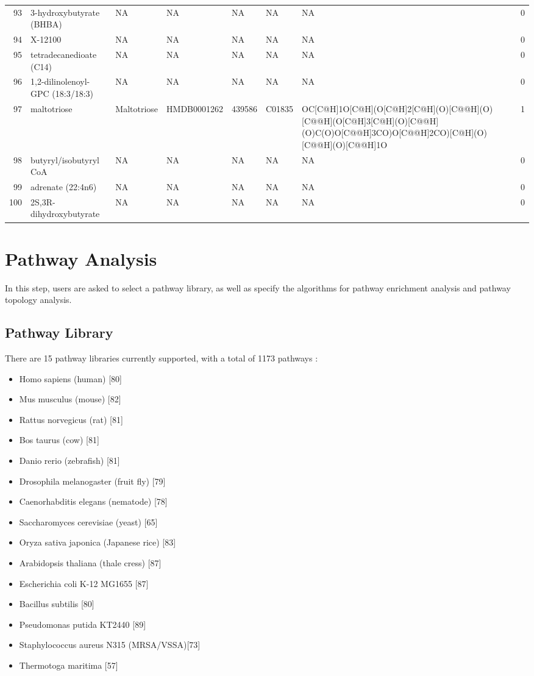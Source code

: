\documentclass[a4paper]{article}
\begin{document}
\begin{longtable}{rlllllll}
  93 & 3-hydroxybutyrate (BHBA) & NA & NA & NA & NA & NA & 0 \\ 
  94 & X-12100 & NA & NA & NA & NA & NA & 0 \\ 
  95 & tetradecanedioate (C14) & NA & NA & NA & NA & NA & 0 \\ 
  96 & 1,2-dilinolenoyl-GPC (18:3/18:3) & NA & NA & NA & NA & NA & 0 \\ 
  97 & maltotriose & Maltotriose & HMDB0001262 & 439586 & C01835 & OC[C@H]1O[C@H](O[C@H]2[C@H](O)[C@@H](O)[C@@H](O[C@H]3[C@H](O)[C@@H](O)C(O)O[C@@H]3CO)O[C@@H]2CO)[C@H](O)[C@@H](O)[C@@H]1O & 1 \\ 
  98 & butyryl/isobutyryl CoA & NA & NA & NA & NA & NA & 0 \\ 
  99 & adrenate (22:4n6) & NA & NA & NA & NA & NA & 0 \\ 
  100 & 2S,3R-dihydroxybutyrate & NA & NA & NA & NA & NA & 0 \\ 
   \hline
\hline
\end{longtable}
\endgroup\clearpage


\section{Pathway Analysis}

In this step, users are asked to select a pathway library, as well as specify the algorithms for pathway
enrichment analysis and pathway topology analysis. 

\subsection{Pathway Library}

There are 15 pathway libraries currently supported, with a total of 1173 pathways :

\begin{itemize}
\item{Homo sapiens (human) [80]}
\item{Mus musculus (mouse) [82]}
\item{Rattus norvegicus (rat) [81]}
\item{Bos taurus (cow) [81]}
\item{Danio rerio (zebrafish) [81]}
\item{Drosophila melanogaster (fruit fly) [79]}
\item{Caenorhabditis elegans (nematode) [78]}
\item{Saccharomyces cerevisiae (yeast) [65]}
\item{Oryza sativa japonica (Japanese rice) [83]}
\item{Arabidopsis thaliana (thale cress) [87]}
\item{Escherichia coli K-12 MG1655 [87]}
\item{Bacillus subtilis [80]}
\item{Pseudomonas putida KT2440 [89]}
\item{Staphylococcus aureus N315 (MRSA/VSSA)[73]}
\item{Thermotoga maritima [57]}
\end{itemize}
\end{document}
